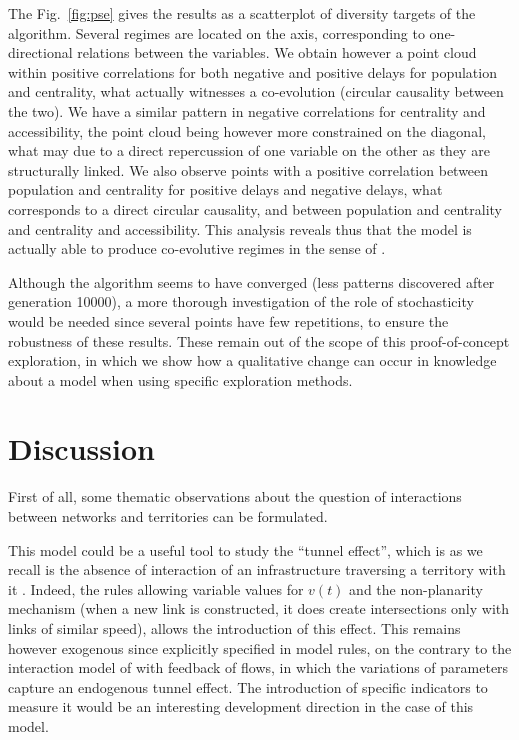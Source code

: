 The Fig.~\ref{fig:pse} gives the results as a scatterplot of diversity targets of the algorithm. Several regimes are located on the axis, corresponding to one-directional relations between the variables. We obtain however a point cloud within positive correlations for both negative and positive delays for population and centrality, what actually witnesses a co-evolution (circular causality between the two). We have a similar pattern in negative correlations for centrality and accessibility, the point cloud being however more constrained on the diagonal, what may due to a direct repercussion of one variable on the other as they are structurally linked. We also observe points with a positive correlation between population and centrality for positive delays and negative delays, what corresponds to a direct circular causality, and between population and centrality and centrality and accessibility. This analysis reveals thus that the model is actually able to produce co-evolutive regimes in the sense of \cite{raimbault:tel-01857741}.


Although the algorithm seems to have converged (less patterns discovered after generation 10000), a more thorough investigation of the role of stochasticity would be needed since several points have few repetitions, to ensure the robustness of these results. These remain out of the scope of this proof-of-concept exploration, in which we show how a qualitative change can occur in knowledge about a model when using specific exploration methods.




\section{Discussion}


First of all, some thematic observations about the question of interactions between networks and territories can be formulated.


This model could be a useful tool to study the ``tunnel effect'', which is as we recall is the absence of interaction of an infrastructure traversing a territory with it \cite{raimbault2018indirect}. Indeed, the rules allowing variable values for $v(t)$ and the non-planarity mechanism (when a new link is constructed, it does create intersections only with links of similar speed), allows the introduction of this effect. This remains however exogenous since explicitly specified in model rules, on the contrary to the interaction model of \cite{raimbault2018indirect} with feedback of flows, in which the variations of parameters capture an endogenous tunnel effect. The introduction of specific indicators to measure it would be an interesting development direction in the case of this model.

